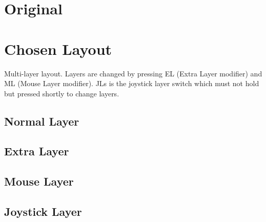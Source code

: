 \documentclass[a4paper,english]{article}
\begin{document}
\unitlength 0.0075cm

\section*{Original}


\section*{Chosen Layout}

Multi-layer layout.  Layers are changed by pressing \textsf{EL} (Extra Layer
modifier) and \textsf{ML} (Mouse Layer modifier).  \textsf{JLs} is the joystick
layer switch which must not hold but pressed shortly to change layers.

\subsection*{Normal Layer}


\subsection*{Extra Layer}


\subsection*{Mouse Layer}


\subsection*{Joystick Layer}

\end{document}
